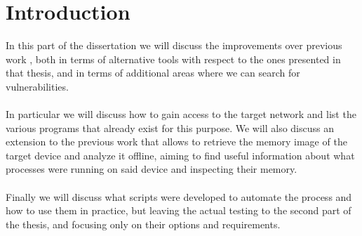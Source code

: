 \chapter{Introduction}
In this part of the dissertation we will discuss the improvements over
previous work \cite{previouswork}, both in terms of alternative tools
with respect to the ones presented in that thesis, and in terms of additional
areas where we can search for vulnerabilities.\\\\
In particular we will discuss how to gain access to the target network and list the
various programs that already exist for this purpose. We will also discuss
an extension to the previous work that allows to retrieve the memory image
of the target device and analyze it offline, aiming to find useful information
about what processes were running on said device and inspecting their memory.\\\\
Finally we will discuss what scripts were developed to automate the process
and how to use them in practice, but leaving the actual testing to the second part
of the thesis, and focusing only on their options and requirements.
\newpage